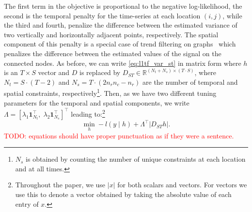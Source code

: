 \documentclass{article}
\newcommand{\attn}[1]{\textcolor{red}{TODO: #1}}
\newcommand{\one}{\mathbf{1}}
\newcommand{\given}{\;\vert\;}
\begin{document}
The first term in the objective is proportional to the negative
log-likelihood, the second is the temporal penalty for the
time-series at each location $(i,j)$, while the third and fourth,
penalize the difference between the estimated variance of two
vertically and horizontally adjacent points, respectively. The spatial
component of this
penalty is a special case of trend
filtering on graphs~\citep{WangSharpnack2016} which penalizes the difference
between the estimated values of the signal on the connected
nodes. As before, we can write
\eqref{eq:l1tf_var_st} in matrix form where $h$ is an $T\times
S$ vector and $D$ is replaced by $D_{ST} \in \mathbb{R}^{(N_t+N_s)
  \times (T \cdot S)	}$, where $N_t=S \cdot (T-2)$ and $N_s=T \cdot
(2n_rn_c-n_r)$ are the number of temporal and spatial constraints,
respectively\footnote{$N_s$ is obtained by counting the number of
  unique constraints at each location and at all times.}. Then, as we 
have two different tuning parameters for the temporal and spatial
components, we write $\Lambda =\left[\lambda_1\one_{N_t}^\top,\;
  \lambda_2\one_{N_s}^\top\right]^\top$ leading
to:\footnote{Throughout the paper, we use $|x|$ for both scalars and
  vectors. For vectors we use this to denote a vector obtained by
  taking the absolute value of each entry of $x$.} 
\begin{equation}
\min_h -l(y\given h)+ \Lambda^\top | D_{ST}h |.
\label{eq:l1tf_var_st_mat}
\end{equation}
\attn{equations should have proper punctuation as if they were a sentence.}
\end{document}
